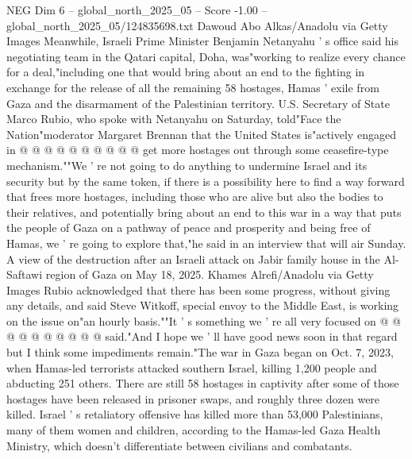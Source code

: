 \begin{textsample}{NEG Dim 6 – global\_north\_2025\_05 – Score -1.00 – global\_north\_2025\_05/124835698.txt}
Dawoud Abo Alkas/Anadolu via Getty Images Meanwhile, Israeli Prime Minister Benjamin Netanyahu ' s office said his negotiating team in the Qatari capital, Doha, was"working to realize every chance for a deal,"including one that would bring about an end to the fighting in exchange for the release of all the remaining 58 hostages, Hamas ' exile from Gaza and the disarmament of the Palestinian territory.
U.S.
Secretary of State Marco Rubio, who spoke with Netanyahu on Saturday, told"Face the Nation"moderator Margaret Brennan that the United States is"actively engaged in @ @ @ @ @ @ @ @ @ @ get more hostages out through some ceasefire-type mechanism.""We ' re not going to do anything to undermine Israel and its security but by the same token, if there is a possibility here to find a way forward that frees more hostages, including those who are alive but also the bodies to their relatives, and potentially bring about an end to this war in a way that puts the people of Gaza on a pathway of peace and prosperity and being free of Hamas, we ' re going to explore that,"he said in an interview that will air Sunday.
A view of the destruction after an Israeli attack on Jabir family house in the Al-Saftawi region of Gaza on May 18, 2025.
Khames Alrefi/Anadolu via Getty Images Rubio acknowledged that there has been some progress, without giving any details, and said Steve Witkoff, special envoy to the Middle East, is working on the issue on"an hourly basis.""It ' s something we ' re all very focused on @ @ @ @ @ @ @ @ @ @ said."And I hope we ' ll have good news soon in that regard but I think some impediments remain."The war in Gaza began on Oct. 7, 2023, when Hamas-led terrorists attacked southern Israel, killing 1,200 people and abducting 251 others.
There are still 58 hostages in captivity after some of those hostages have been released in prisoner swaps, and roughly three dozen were killed.
Israel ' s retaliatory offensive has killed more than 53,000 Palestinians, many of them women and children, according to the Hamas-led Gaza Health Ministry, which doesn't differentiate between civilians and combatants.

\end{textsample}
